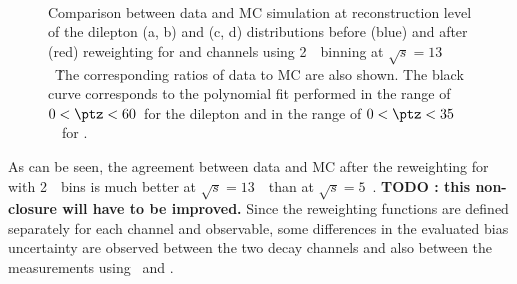 \begin{figure}[h]
\centering
{}
\\
\caption{Comparison between data and MC simulation at reconstruction level of the dilepton \pt (a, b) and \ut (c, d) distributions before (blue) and after (red) reweighting for \Zee and \Zmm channels using  2~\GeV\ binning at $\sqrt{s} = 13$~\TeV\. The corresponding ratios of data to MC are also shown.  The black curve corresponds to the polynomial fit performed in the range of $0<\ptz<60$~\GeV for the dilepton \pt and in the range of $0<\ptz<35$~\GeV\ for \ut. }
\label{fig:fits_13_2GeV}
\end{figure}

As can be seen, the agreement between data and MC after the reweighting for \ptz with 2~\GeV\ bins is much better at $\sqrt{s} = 13$~\TeV\ than at $\sqrt{s} = 5$~\TeV. \textbf{TODO : this non-closure will have to be improved.} Since the reweighting functions are defined separately for each channel and   observable, some differences in the evaluated bias uncertainty are observed between the two decay channels and also between the measurements using \ut\ and \ptdilep.


